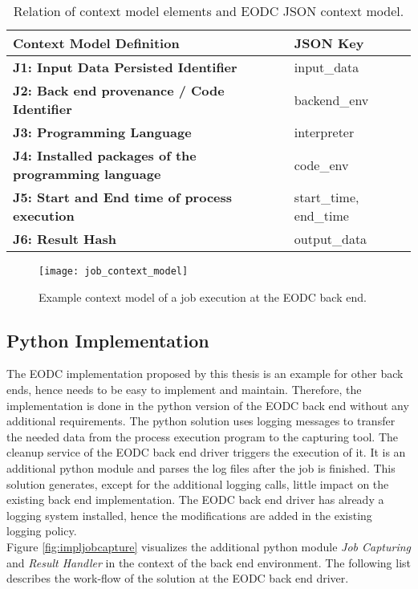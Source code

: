 \documentclass[draft,final]{vutinfth} %
\begin{document}
\begin{table}[]
	\caption{Relation of context model elements and EODC JSON context model.}
	\begin{tabular}{l|l}
		\textbf{Context Model Definition} & \textbf{JSON Key} \\ \hline
		\textbf{J1: Input Data Persisted Identifier} & input\_data \\ \hline
		\textbf{J2: Back end provenance / Code Identifier} & backend\_env \\ \hline
		\textbf{J3: Programming Language} & interpreter \\ \hline
		\textbf{J4: Installed packages of the programming language} & code\_env \\ \hline
		\textbf{J5: Start and End time of process execution} & start\_time, end\_time \\ \hline
		\textbf{J6: Result Hash} & output\_data \\ %
	\end{tabular}
\label{Tab:contextmodel}
\end{table}

\begin{figure}[h]
	\centering
	\texttt{[image: job\_context\_model]}
	\caption{Example context model of a job execution at the EODC back end.}
	\label{fig:job_context_model} %
\end{figure}

\subsection{Python Implementation}\label{Implementation:Python Implementation}
The EODC implementation proposed by this thesis is an example for other back ends, hence needs to be easy to implement and maintain. Therefore, the implementation is done in the python version of the EODC back end without any additional requirements. The python solution uses logging messages to transfer the needed data from the process execution program to the capturing tool. The cleanup service of the EODC back end driver triggers the execution of it. It is an additional python module and parses the log files after the job is finished. This solution generates, except for the additional logging calls, little impact on the existing back end implementation. The EODC back end driver has already a logging system installed, hence the modifications are added in the existing logging policy. \\
Figure \ref{fig:impljobcapture} visualizes the additional python module \textit{Job Capturing} and \textit{Result Handler} in the context of the back end environment. The following list describes the work-flow of the solution at the EODC back end driver. 
\end{document}

